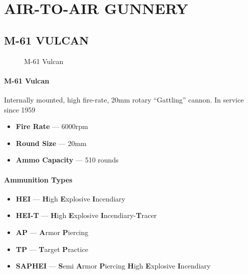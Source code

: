\section{AIR-TO-AIR GUNNERY}

\subsection{M-61 VULCAN}
\label{subsec:m61}

\begin{figure}[htbp]
    \centering
    \caption{M-61 Vulcan}
\end{figure}

\paragraph{M-61 Vulcan}
Internally mounted, high fire-rate, 20mm rotary ``Gattling'' cannon.
In service since 1959

\begin{itemize}
    \item \textbf{Fire Rate} --- 6000rpm
    \item \textbf{Round Size} --- 20mm
    \item \textbf{Ammo Capacity} --- 510 rounds
\end{itemize}

\paragraph{Ammunition Types}
\begin{itemize}
    \item \textbf{HEI} --- \textbf{H}igh \textbf{E}xplosive \textbf{I}ncendiary
    \item \textbf{HEI-T} --- \textbf{H}igh \textbf{E}xplosive \textbf{I}ncendiary-\textbf{T}racer
    \item \textbf{AP} --- \textbf{A}rmor \textbf{P}iercing
    \item \textbf{TP} --- \textbf{T}arget \textbf{P}ractice
    \item \textbf{SAPHEI} --- \textbf{S}emi \textbf{A}rmor \textbf{P}iercing \textbf{H}igh \textbf{E}xplosive \textbf{I}ncendiary
\end{itemize}

